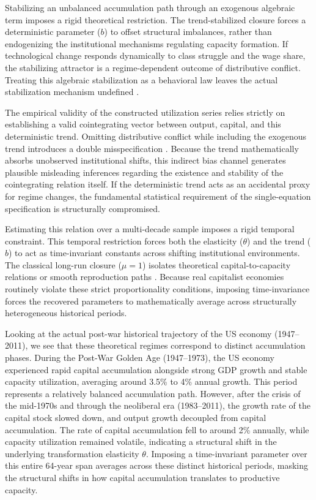 \documentclass[11pt]{article}
\begin{document}
Stabilizing an unbalanced accumulation path through an exogenous algebraic term imposes a rigid theoretical restriction. The trend-stabilized closure forces a deterministic parameter ($b$) to offset structural imbalances, rather than endogenizing the institutional mechanisms regulating capacity formation. If technological change responds dynamically to class struggle and the wage share, the stabilizing attractor is a regime-dependent outcome of distributive conflict. Treating this algebraic stabilization as a behavioral law leaves the actual stabilization mechanism undefined \citep{Shaikh1974}.

The empirical validity of the constructed utilization series relies strictly on establishing a valid cointegrating vector between output, capital, and this deterministic trend. Omitting distributive conflict while including the exogenous trend introduces a double misspecification \citep{Basu2020}. Because the trend mathematically absorbs unobserved institutional shifts, this indirect bias channel generates plausible misleading inferences regarding the existence and stability of the cointegrating relation itself. If the deterministic trend acts as an accidental proxy for regime changes, the fundamental statistical requirement of the single-equation specification is structurally compromised.

Estimating this relation over a multi-decade sample imposes a rigid temporal constraint. This temporal restriction forces both the elasticity ($\theta$) and the trend ($b$) to act as time-invariant constants across shifting institutional environments. The classical long-run closure ($\mu = 1$) isolates theoretical capital-to-capacity relations \citep{Foley1985} or smooth reproduction paths \citep{Okishio2022, Basu2022}. Because real capitalist economies routinely violate these strict proportionality conditions, imposing time-invariance forces the recovered parameters to mathematically average across structurally heterogeneous historical periods.

Looking at the actual post-war historical trajectory of the US economy (1947–2011), we see that these theoretical regimes correspond to distinct accumulation phases. During the Post-War Golden Age (1947–1973), the US economy experienced rapid capital accumulation alongside strong GDP growth and stable capacity utilization, averaging around 3.5\% to 4\% annual growth. This period represents a relatively balanced accumulation path. However, after the crisis of the mid-1970s and through the neoliberal era (1983–2011), the growth rate of the capital stock slowed down, and output growth decoupled from capital accumulation. The rate of capital accumulation fell to around 2\% annually, while capacity utilization remained volatile, indicating a structural shift in the underlying transformation elasticity $\theta$. Imposing a time-invariant parameter over this entire 64-year span averages across these distinct historical periods, masking the structural shifts in how capital accumulation translates to productive capacity.
\end{document}
